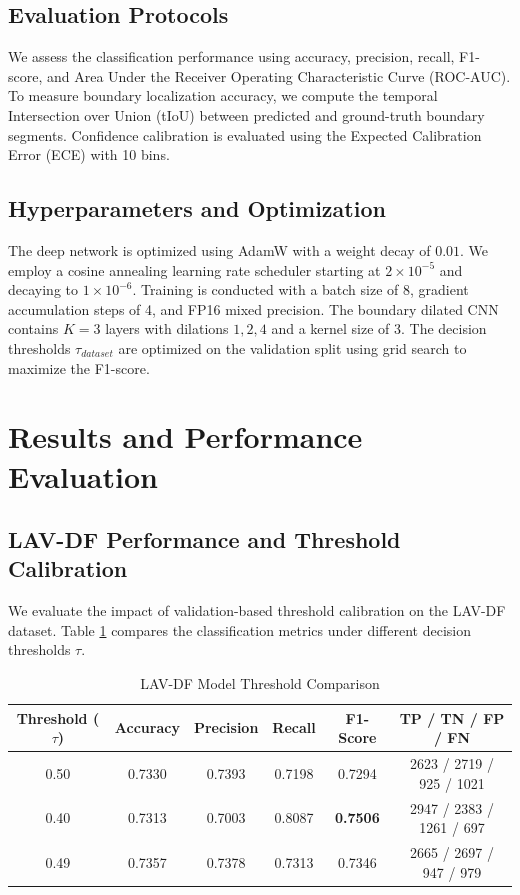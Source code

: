 \documentclass[journal,10pt,onecolumn,draftclsnofoot]{IEEEtran}
\begin{document}
\subsection{Evaluation Protocols}
We assess the classification performance using accuracy, precision, recall, F1-score, and Area Under the Receiver Operating Characteristic Curve (ROC-AUC). To measure boundary localization accuracy, we compute the temporal Intersection over Union (tIoU) between predicted and ground-truth boundary segments. Confidence calibration is evaluated using the Expected Calibration Error (ECE) with 10 bins.

\subsection{Hyperparameters and Optimization}
The deep network is optimized using AdamW with a weight decay of $0.01$. We employ a cosine annealing learning rate scheduler starting at $2 \times 10^{-5}$ and decaying to $1 \times 10^{-6}$. Training is conducted with a batch size of 8, gradient accumulation steps of 4, and FP16 mixed precision. The boundary dilated CNN contains $K=3$ layers with dilations $1, 2, 4$ and a kernel size of 3. The decision thresholds $\tau_{dataset}$ are optimized on the validation split using grid search to maximize the F1-score.

\section{Results and Performance Evaluation}
\subsection{LAV-DF Performance and Threshold Calibration}
We evaluate the impact of validation-based threshold calibration on the LAV-DF dataset. Table \ref{tab:lavdf_threshold_comp} compares the classification metrics under different decision thresholds $\tau$.

\begin{table}[htbp]
\caption{LAV-DF Model Threshold Comparison}
\label{tab:lavdf_threshold_comp}
\centering
\begin{tabular}{cccccc}
\toprule
Threshold ($\tau$) & Accuracy & Precision & Recall & F1-Score & TP / TN / FP / FN \\
\midrule
0.50 & 0.7330 & 0.7393 & 0.7198 & 0.7294 & 2623 / 2719 / 925 / 1021 \\
0.40 & 0.7313 & 0.7003 & 0.8087 & \textbf{0.7506} & 2947 / 2383 / 1261 / 697 \\
0.49 & 0.7357 & 0.7378 & 0.7313 & 0.7346 & 2665 / 2697 / 947 / 979 \\
\bottomrule
\end{tabular}
\end{table}
\end{document}
